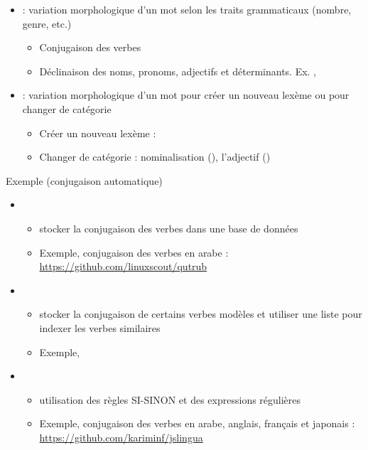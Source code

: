 \documentclass{KodeBook}
\begin{document}
\begin{itemize}
	\item {} : variation morphologique d'un mot selon les traits grammaticaux (nombre, genre, etc.)
	\begin{itemize}
		\item Conjugaison des verbes 
		\item Déclinaison des noms, pronoms, adjectifs et déterminants. 
		Ex. , 
	\end{itemize}
	\item {} : variation morphologique d'un mot pour créer un nouveau lexème ou pour changer de catégorie
	\begin{itemize}
		\item Créer un nouveau lexème : 
		\item Changer de catégorie : nominalisation (), l'adjectif ()
	\end{itemize}
\end{itemize}

Exemple (conjugaison automatique)
\begin{itemize}
	\item {}
	\begin{itemize}
		\item stocker la conjugaison des verbes dans une base de données
		\item Exemple, conjugaison des verbes en arabe : \url{https://github.com/linuxscout/qutrub}
	\end{itemize}
	\item {}
	\begin{itemize}
		\item stocker la conjugaison de certains verbes modèles et utiliser une liste pour indexer les verbes similaires
		\item Exemple, 
	\end{itemize}
	\item {}
	\begin{itemize}
		\item utilisation des règles SI-SINON et des expressions régulières
		\item Exemple, conjugaison des verbes en arabe, anglais, français et japonais : \url{https://github.com/kariminf/jslingua}
	\end{itemize}
\end{itemize}
\end{document}
